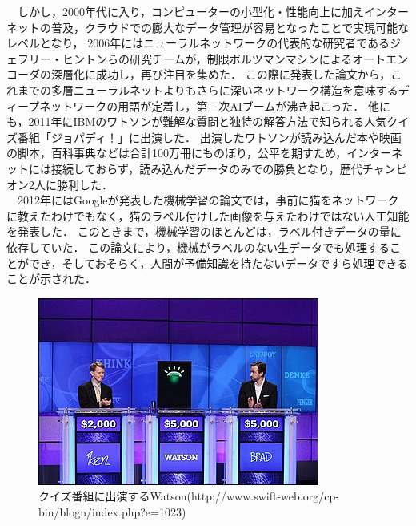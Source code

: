 　しかし，2000年代に入り，コンピューターの小型化・性能向上に加えインターネットの普及，クラウドでの膨大なデータ管理が容易となったことで実現可能なレベルとなり，
2006年にはニューラルネットワークの代表的な研究者であるジェフリー・ヒントンらの研究チームが，制限ボルツマンマシンによるオートエンコーダの深層化に成功し，再び注目を集めた．
この際に発表した論文から，これまでの多層ニューラルネットよりもさらに深いネットワーク構造を意味するディープネットワークの用語が定着し，第三次AIブームが沸き起こった．
他にも，2011年にIBMのワトソンが難解な質問と独特の解答方法で知られる人気クイズ番組「ジョパディ！」に出演した．\cite{webpage6}
出演したワトソンが読み込んだ本や映画の脚本，百科事典などは合計100万冊にものぼり，公平を期すため，インターネットには接続しておらず，読み込んだデータのみでの勝負となり，歴代チャンピオン2人に勝利した．\\
　2012年にはGoogleが発表した機械学習の論文では，事前に猫をネットワークに教えたわけでもなく，猫のラベル付けした画像を与えたわけではない人工知能を発表した．\cite{ronbun3}
このときまで，機械学習のほとんどは，ラベル付きデータの量に依存していた．
この論文により，機械がラベルのない生データでも処理することができ，そしておそらく，人間が予備知識を持たないデータですら処理できることが示された．
\begin{figure}[!ht]
    \begin{screen}
    \begin{center}
        \includegraphics[scale=1.1, clip]{./img/Watson.jpg}
        \caption{クイズ番組に出演するWatson\newline(http://www.swift-web.org/cp-bin/blogn/index.php?e=1023)}
        \label{fig:クイズ番組に出演するWatson}
    \end{center}
\end{screen}
\end{figure}\\
\newpage
